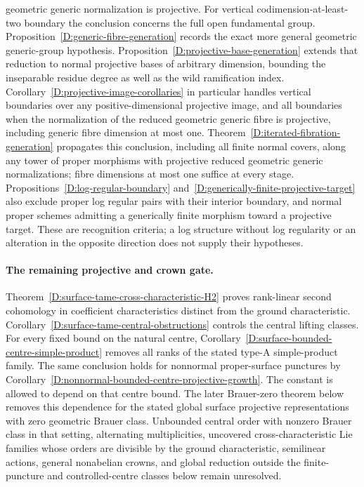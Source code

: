 \begin{remark}
geometric generic normalization is projective.  For vertical
codimension-at-least-two boundary the conclusion concerns the full
open fundamental group.  Proposition~\ref{D:generic-fibre-generation}
records the exact more general geometric generic-group hypothesis.
Proposition~\ref{D:projective-base-generation} extends that reduction
to normal projective bases of arbitrary dimension, bounding the
inseparable residue degree as well as the wild ramification index.
Corollary~\ref{D:projective-image-corollaries} in particular handles
vertical boundaries over any positive-dimensional projective image,
and all boundaries when the normalization of the reduced geometric
generic fibre is projective, including generic fibre dimension at
most one.  Theorem~\ref{D:iterated-fibration-generation}
propagates this conclusion, including all finite normal covers,
along any tower of proper morphisms with projective reduced
geometric generic normalizations; fibre dimensions at most one
suffice at every stage.
Propositions~\ref{D:log-regular-boundary}
and~\ref{D:generically-finite-projective-target} also exclude
proper log regular pairs with their interior boundary, and
normal proper schemes admitting a generically finite morphism
toward a projective target.  These are recognition criteria;
a log structure without log regularity or an alteration in the
opposite direction does not supply their hypotheses.
\end{remark}



\paragraph{The remaining projective and crown gate.}
Theorem~\ref{D:surface-tame-cross-characteristic-H2} proves
rank-linear second cohomology in coefficient characteristics distinct
from the ground characteristic. Corollary~\ref{D:surface-tame-central-obstructions}
controls the central lifting classes. For every fixed bound on the natural
centre, Corollary~\ref{D:surface-bounded-centre-simple-product} removes
all ranks of the stated type-A simple-product family. The same conclusion
holds for nonnormal proper-surface punctures by
Corollary~\ref{D:nonnormal-bounded-centre-projective-growth}.
The constant is allowed to depend on that centre bound. The later
Brauer-zero theorem below removes this dependence for the stated global
surface projective representations with zero geometric Brauer class.
Unbounded central order with nonzero Brauer class in that setting,
alternating multiplicities, uncovered cross-characteristic Lie families
whose orders are divisible by the ground characteristic, semilinear actions, general nonabelian
crowns, and global reduction outside the finite-puncture and controlled-centre
classes below remain unresolved.


